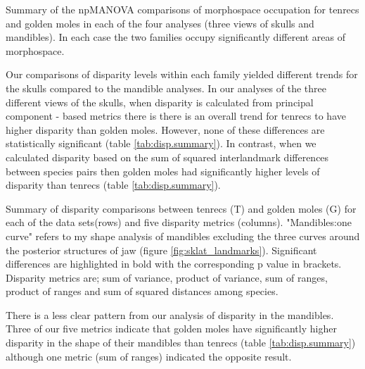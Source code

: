 	\begin{table}[!htb]	%

	\caption[Summary of npMANOVA comparisons of morphospace occupation for tenrecs and golden moles]
		{Summary of the npMANOVA comparisons of morphospace occupation for tenrecs and golden moles in each of the four analyses (three views of skulls and mandibles). In each case the two families occupy significantly different areas of morphospace.}
	\centering
	 
	\label{tab:npmanova.summary}  
	\end{table}
	Our comparisons of disparity levels within each family yielded different trends for the skulls compared to the mandible analyses.	
	In our analyses of the three different views of the skulls, when disparity is calculated from principal component - based metrics there is there is an overall trend for tenrecs to have higher disparity than golden moles. However, none of these differences are statistically significant (table \ref{tab:disp.summary}). In contrast, when we calculated disparity based on the sum of squared interlandmark differences between species pairs \citep{Zelditch2012} then golden moles had significantly higher levels of disparity than tenrecs (table \ref{tab:disp.summary}).

\bigskip
	\begin{table}[!htb]			
	\caption[Summary of disparity comparisons between tenrecs and golden moles]
		{Summary of disparity comparisons between tenrecs (T) and golden moles (G) for each of the data sets(rows) and five disparity metrics (columns). "Mandibles:one curve" refers to my shape analysis of mandibles excluding the three curves around the posterior structures of jaw (figure \ref{fig:sklat_landmarks}). Significant differences are highlighted in bold with the corresponding p value in brackets. Disparity metrics are; sum of variance, product of variance, sum of ranges, product of ranges and sum of squared distances among species. }
	\centering
	 
	\label{tab:disp.summary}  
	\end{table}
\bigskip
	There is a less clear pattern from our analysis of disparity in the mandibles. Three of our five metrics indicate that golden moles have significantly higher disparity in the shape of their mandibles than tenrecs (table \ref{tab:disp.summary}) although one metric (sum of ranges) indicated the opposite result. 
	
